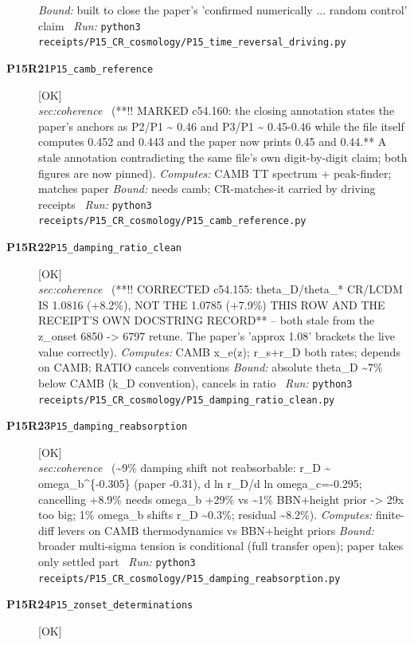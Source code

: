 \begin{description}
 \emph{Bound:} built to close the paper's 'confirmed numerically ... random control' claim
\ \emph{Run:} \texttt{python3 receipts/P15\_CR\_cosmology/P15\_time\_reversal\_driving.py}
\item[\rcptlabel{P15_camb_reference}{P15R21}\textbf{P15R21}\quad\texttt{P15\_camb\_reference}]\hfill\textsf{[OK]}\\
\textit{sec:coherence} \ (**!! MARKED c54.160: the closing annotation states the paper's anchors as P2/P1 \textasciitilde{} 0.46 and P3/P1 \textasciitilde{} 0.45-0.46 while the file itself computes 0.452 and 0.443 and the paper now prints 0.45 and 0.44.** A stale annotation contradicting the same file's own digit-by-digit claim; both figures are now pinned). 
\emph{Computes:} CAMB TT spectrum + peak-finder; matches paper
 \emph{Bound:} needs camb; CR-matches-it carried by driving receipts
\ \emph{Run:} \texttt{python3 receipts/P15\_CR\_cosmology/P15\_camb\_reference.py}
\item[\rcptlabel{P15_damping_ratio_clean}{P15R22}\textbf{P15R22}\quad\texttt{P15\_damping\_ratio\_clean}]\hfill\textsf{[OK]}\\
\textit{sec:coherence} \ (**!! CORRECTED c54.155: theta\_D/theta\_* CR/LCDM IS 1.0816 (+8.2\%), NOT THE 1.0785 (+7.9\%) THIS ROW AND THE RECEIPT'S OWN DOCSTRING RECORD** -- both stale from the z\_onset 6850 -> 6797 retune. The paper's 'approx 1.08' brackets the live value correctly). 
\emph{Computes:} CAMB x\_e(z); r\_s+r\_D both rates; depends on CAMB; RATIO cancels conventions
 \emph{Bound:} absolute theta\_D \textasciitilde{}7\% below CAMB (k\_D convention), cancels in ratio
\ \emph{Run:} \texttt{python3 receipts/P15\_CR\_cosmology/P15\_damping\_ratio\_clean.py}
\item[\rcptlabel{P15_damping_reabsorption}{P15R23}\textbf{P15R23}\quad\texttt{P15\_damping\_reabsorption}]\hfill\textsf{[OK]}\\
\textit{sec:coherence} \ (\textasciitilde{}9\% damping shift not reabsorbable: r\_D \textasciitilde{} omega\_b\textasciicircum{}\{-0.305\} (paper -0.31), d ln r\_D/d ln omega\_c=-0.295; cancelling +8.9\% needs omega\_b +29\% vs \textasciitilde{}1\% BBN+height prior -> 29x too big; 1\% omega\_b shifts r\_D \textasciitilde{}0.3\%; residual \textasciitilde{}8.2\%). 
\emph{Computes:} finite-diff levers on CAMB thermodynamics vs BBN+height priors
 \emph{Bound:} broader multi-sigma tension is conditional (full transfer open); paper takes only settled part
\ \emph{Run:} \texttt{python3 receipts/P15\_CR\_cosmology/P15\_damping\_reabsorption.py}
\item[\rcptlabel{P15_zonset_determinations}{P15R24}\textbf{P15R24}\quad\texttt{P15\_zonset\_determinations}]\hfill\textsf{[OK]}\\

\end{description}
